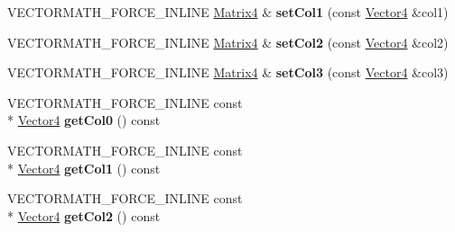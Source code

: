 \begin{DoxyCompactItemize}
\item 
\hypertarget{class_vectormath_1_1_aos_1_1_matrix4_a2367d8148278b125ceea6603743e2b43}{V\+E\+C\+T\+O\+R\+M\+A\+T\+H\+\_\+\+F\+O\+R\+C\+E\+\_\+\+I\+N\+L\+I\+N\+E \hyperlink{class_vectormath_1_1_aos_1_1_matrix4}{Matrix4} \& {\bfseries set\+Col1} (const \hyperlink{class_vectormath_1_1_aos_1_1_vector4}{Vector4} \&col1)}\label{class_vectormath_1_1_aos_1_1_matrix4_a2367d8148278b125ceea6603743e2b43}

\item 
\hypertarget{class_vectormath_1_1_aos_1_1_matrix4_a03b79b4ed8e3e60649d42dfb5f62a273}{V\+E\+C\+T\+O\+R\+M\+A\+T\+H\+\_\+\+F\+O\+R\+C\+E\+\_\+\+I\+N\+L\+I\+N\+E \hyperlink{class_vectormath_1_1_aos_1_1_matrix4}{Matrix4} \& {\bfseries set\+Col2} (const \hyperlink{class_vectormath_1_1_aos_1_1_vector4}{Vector4} \&col2)}\label{class_vectormath_1_1_aos_1_1_matrix4_a03b79b4ed8e3e60649d42dfb5f62a273}

\item 
\hypertarget{class_vectormath_1_1_aos_1_1_matrix4_af6cedd35b65c870084130f9c5dd9d66a}{V\+E\+C\+T\+O\+R\+M\+A\+T\+H\+\_\+\+F\+O\+R\+C\+E\+\_\+\+I\+N\+L\+I\+N\+E \hyperlink{class_vectormath_1_1_aos_1_1_matrix4}{Matrix4} \& {\bfseries set\+Col3} (const \hyperlink{class_vectormath_1_1_aos_1_1_vector4}{Vector4} \&col3)}\label{class_vectormath_1_1_aos_1_1_matrix4_af6cedd35b65c870084130f9c5dd9d66a}

\item 
\hypertarget{class_vectormath_1_1_aos_1_1_matrix4_a7a1ec6bb10b9d72530a1ba7dfdec8b8a}{V\+E\+C\+T\+O\+R\+M\+A\+T\+H\+\_\+\+F\+O\+R\+C\+E\+\_\+\+I\+N\+L\+I\+N\+E const \\*
\hyperlink{class_vectormath_1_1_aos_1_1_vector4}{Vector4} {\bfseries get\+Col0} () const }\label{class_vectormath_1_1_aos_1_1_matrix4_a7a1ec6bb10b9d72530a1ba7dfdec8b8a}

\item 
\hypertarget{class_vectormath_1_1_aos_1_1_matrix4_a369c3457ac70da004d22ec3940e664ba}{V\+E\+C\+T\+O\+R\+M\+A\+T\+H\+\_\+\+F\+O\+R\+C\+E\+\_\+\+I\+N\+L\+I\+N\+E const \\*
\hyperlink{class_vectormath_1_1_aos_1_1_vector4}{Vector4} {\bfseries get\+Col1} () const }\label{class_vectormath_1_1_aos_1_1_matrix4_a369c3457ac70da004d22ec3940e664ba}

\item 
\hypertarget{class_vectormath_1_1_aos_1_1_matrix4_a21ae9cbb67b8cd8c5e74db18723f660f}{V\+E\+C\+T\+O\+R\+M\+A\+T\+H\+\_\+\+F\+O\+R\+C\+E\+\_\+\+I\+N\+L\+I\+N\+E const \\*
\hyperlink{class_vectormath_1_1_aos_1_1_vector4}{Vector4} {\bfseries get\+Col2} () const }\label{class_vectormath_1_1_aos_1_1_matrix4_a21ae9cbb67b8cd8c5e74db18723f660f}


\end{DoxyCompactItemize}
